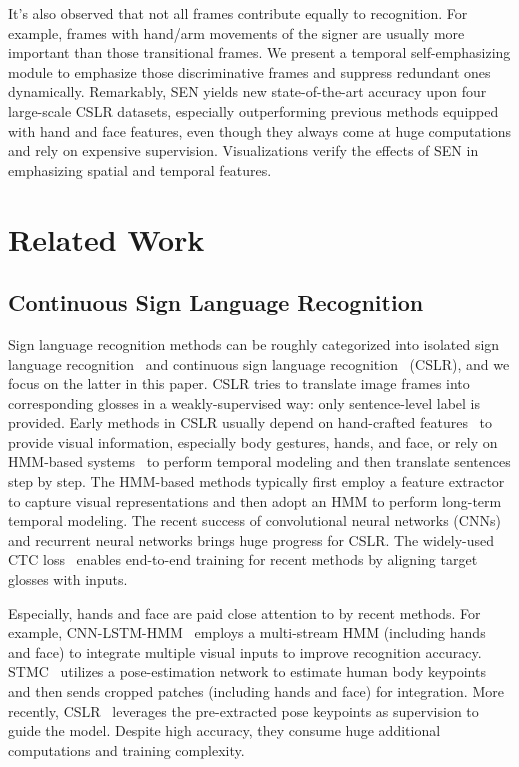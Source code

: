 \documentclass[letterpaper]{article} \usepackage{aaai23}  \usepackage{times}  \usepackage{helvet}  \usepackage{courier}  \usepackage[hyphens]{url}  \usepackage{graphicx} \urlstyle{rm} \def\UrlFont{\rm}  \usepackage{natbib}  \usepackage{caption} \frenchspacing  \setlength{\pdfpagewidth}{8.5in} \setlength{\pdfpageheight}{11in} \usepackage{algorithm}
\begin{document}
It's also observed that not all frames contribute equally to recognition. For example, frames with hand/arm movements of the signer are usually more important than those transitional frames. We present a temporal self-emphasizing module to emphasize those discriminative frames and suppress redundant ones dynamically. Remarkably, SEN yields new state-of-the-art accuracy upon four large-scale CSLR datasets, especially outperforming previous methods equipped with hand and face features, even though they always come at huge computations and rely on expensive supervision. Visualizations verify the effects of SEN in emphasizing spatial and temporal features.

\section{Related Work}
\subsection{Continuous Sign Language Recognition}
Sign language recognition methods can be roughly categorized into isolated sign language recognition~\cite{tunga2021pose,hu2021signbert,hu2021hand} and continuous sign language recognition~\cite{pu2019iterative,cheng2020fully,cui2019deep,niu2020stochastic,Min_2021_ICCV} (CSLR), and we focus on the latter in this paper. CSLR tries to translate image frames into corresponding glosses in a weakly-supervised way: only sentence-level label is provided. Early methods in CSLR usually depend on hand-crafted features~\cite{gao2004chinese,freeman1995orientation} to provide visual information, especially body gestures, hands, and face, or rely on HMM-based systems~\cite{koller2016deepsign,han2009modelling,koller2017re,koller2015continuous} to perform temporal modeling and then translate sentences step by step. The HMM-based methods typically first employ a feature extractor to capture visual representations and then adopt an HMM to perform long-term temporal modeling. The recent success of convolutional neural networks (CNNs) and recurrent neural networks brings huge progress for CSLR. The widely-used CTC loss~\cite{graves2006connectionist} enables end-to-end training for recent methods by aligning target glosses with inputs. 

Especially, hands and face are paid close attention to by recent methods. For example, CNN-LSTM-HMM~\cite{koller2019weakly} employs a multi-stream HMM (including hands and face) to integrate multiple visual inputs to improve recognition accuracy. STMC~\cite{zhou2020spatial} utilizes a pose-estimation network to estimate human body keypoints and then sends cropped patches (including hands and face) for integration. More recently, CSLR~\cite{zuo2022c2slr} leverages the pre-extracted pose keypoints as supervision to guide the model. Despite high accuracy, they consume huge additional computations and training complexity.
\end{document}
